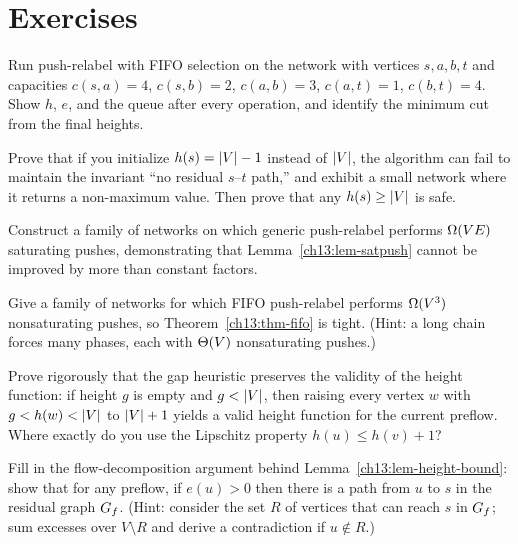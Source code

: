 \section{Exercises}
\label{ch13:exercises}

\begin{exercise}[Trace it]
Run push-relabel with FIFO selection on the network with vertices $s,a,b,t$ and capacities $c(s,a)=4$, $c(s,b)=2$, $c(a,b)=3$, $c(a,t)=1$, $c(b,t)=4$. Show $h$, $e$, and the queue after every operation, and identify the minimum cut from the final heights.
\end{exercise}

\begin{exercise}
Prove that if you initialize $h(s)=\lvert V\rvert-1$ instead of $\lvert V\rvert$, the algorithm can fail to maintain the invariant ``no residual $s$--$t$ path,'' and exhibit a small network where it returns a non-maximum value. Then prove that any $h(s)\ge\lvert V\rvert$ is safe.
\end{exercise}

\begin{exercise}
Construct a family of networks on which generic push-relabel performs $\Omega(VE)$ saturating pushes, demonstrating that Lemma~\ref{ch13:lem-satpush} cannot be improved by more than constant factors.
\end{exercise}

\begin{exercise}
Give a family of networks for which FIFO push-relabel performs $\Omega(V^3)$ nonsaturating pushes, so Theorem~\ref{ch13:thm-fifo} is tight. (Hint: a long chain forces many phases, each with $\Theta(V)$ nonsaturating pushes.)
\end{exercise}

\begin{exercise}
Prove rigorously that the gap heuristic preserves the validity of the height function: if height $g$ is empty and $g<\lvert V\rvert$, then raising every vertex $w$ with $g<h(w)<\lvert V\rvert$ to $\lvert V\rvert+1$ yields a valid height function for the current preflow. Where exactly do you use the Lipschitz property $h(u)\le h(v)+1$?
\end{exercise}

\begin{exercise}
\label{ch13:ex-path-to-source}
Fill in the flow-decomposition argument behind Lemma~\ref{ch13:lem-height-bound}: show that for any preflow, if $e(u)>0$ then there is a path from $u$ to $s$ in the residual graph $G_f$. (Hint: consider the set $R$ of vertices that can reach $s$ in $G_f$; sum excesses over $V\setminus R$ and derive a contradiction if $u\notin R$.)
\end{exercise}


